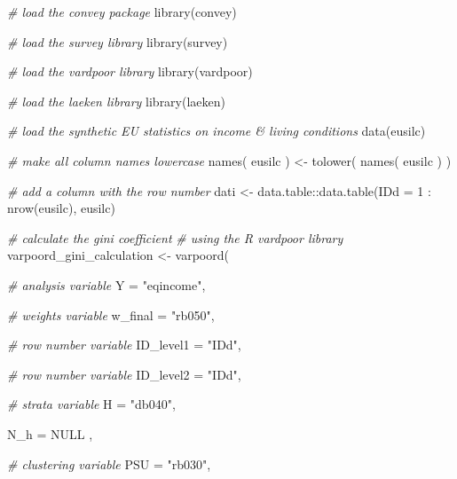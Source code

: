 \documentclass[
]{book}
\newenvironment{Shaded}{\begin{snugshade}}{\end{snugshade}}
\newcommand{\AttributeTok}[1]{\textcolor[rgb]{0.77,0.63,0.00}{#1}}
\newcommand{\CommentTok}[1]{\textcolor[rgb]{0.56,0.35,0.01}{\textit{#1}}}
\newcommand{\ConstantTok}[1]{\textcolor[rgb]{0.00,0.00,0.00}{#1}}
\newcommand{\DecValTok}[1]{\textcolor[rgb]{0.00,0.00,0.81}{#1}}
\newcommand{\FunctionTok}[1]{\textcolor[rgb]{0.00,0.00,0.00}{#1}}
\newcommand{\NormalTok}[1]{#1}
\newcommand{\OtherTok}[1]{\textcolor[rgb]{0.56,0.35,0.01}{#1}}
\newcommand{\SpecialCharTok}[1]{\textcolor[rgb]{0.00,0.00,0.00}{#1}}
\newcommand{\StringTok}[1]{\textcolor[rgb]{0.31,0.60,0.02}{#1}}
\begin{document}
\begin{Shaded}
\begin{Highlighting}[]
\CommentTok{\# load the convey package}
\FunctionTok{library}\NormalTok{(convey)}

\CommentTok{\# load the survey library}
\FunctionTok{library}\NormalTok{(survey)}

\CommentTok{\# load the vardpoor library}
\FunctionTok{library}\NormalTok{(vardpoor)}

\CommentTok{\# load the laeken library}
\FunctionTok{library}\NormalTok{(laeken)}

\CommentTok{\# load the synthetic EU statistics on income \& living conditions}
\FunctionTok{data}\NormalTok{(eusilc)}

\CommentTok{\# make all column names lowercase}
\FunctionTok{names}\NormalTok{( eusilc ) }\OtherTok{\textless{}{-}} \FunctionTok{tolower}\NormalTok{( }\FunctionTok{names}\NormalTok{( eusilc ) )}

\CommentTok{\# add a column with the row number}
\NormalTok{dati }\OtherTok{\textless{}{-}}\NormalTok{ data.table}\SpecialCharTok{::}\FunctionTok{data.table}\NormalTok{(}\AttributeTok{IDd =} \DecValTok{1} \SpecialCharTok{:} \FunctionTok{nrow}\NormalTok{(eusilc), eusilc)}

\CommentTok{\# calculate the gini coefficient}
\CommentTok{\# using the R vardpoor library}
\NormalTok{varpoord\_gini\_calculation }\OtherTok{\textless{}{-}}
    \FunctionTok{varpoord}\NormalTok{(}
    
        \CommentTok{\# analysis variable}
        \AttributeTok{Y =} \StringTok{"eqincome"}\NormalTok{, }
        
        \CommentTok{\# weights variable}
        \AttributeTok{w\_final =} \StringTok{"rb050"}\NormalTok{,}
        
        \CommentTok{\# row number variable}
        \AttributeTok{ID\_level1 =} \StringTok{"IDd"}\NormalTok{,}
        
        \CommentTok{\# row number variable}
        \AttributeTok{ID\_level2 =} \StringTok{"IDd"}\NormalTok{,}
        
        \CommentTok{\# strata variable}
        \AttributeTok{H =} \StringTok{"db040"}\NormalTok{, }
        
        \AttributeTok{N\_h =} \ConstantTok{NULL}\NormalTok{ ,}
        
        \CommentTok{\# clustering variable}
        \AttributeTok{PSU =} \StringTok{"rb030"}\NormalTok{, }
        

\end{Highlighting}
\end{Shaded}
\end{document}

